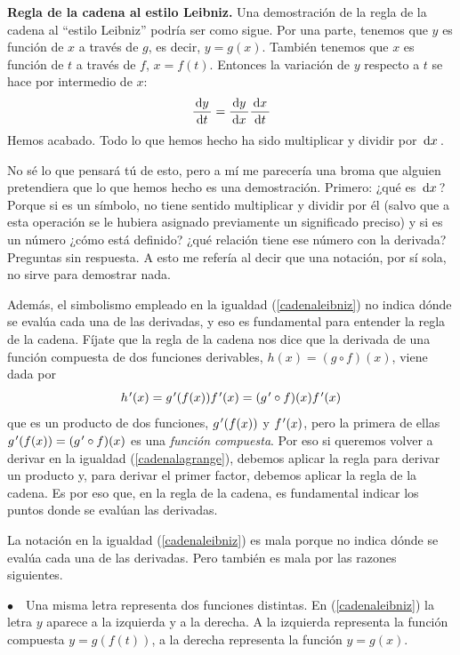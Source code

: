 \noindent \textbf{Regla de la cadena al estilo Leibniz.} Una demostración
de la regla de la cadena al ``estilo Leibniz'' podría ser como sigue.
Por una parte, tenemos que $y$ es función de $x$ a través de $g$,
es decir, $y=g(x)$. También tenemos que $x$ es función de $t$ a
través de $f$, $x=f(t)$. Entonces la variación de $y$ respecto
a $t$ se hace por intermedio de $x$: 
\begin{equation}
\frac{\,\mathrm{d}y\,}{\,\mathrm{d}t\,}=\frac{\,\mathrm{d}y\,}{\,\mathrm{d}x\,}\frac{\,\mathrm{d}x\,}{\,\mathrm{d}t\,}\label{cadenaleibniz}
\end{equation}
Hemos acabado. Todo lo que hemos hecho ha sido multiplicar y dividir
por $\,\mathrm{d}x\,$.

No sé lo que pensará tú de esto, pero a mí me parecería una broma
que alguien pretendiera que lo que hemos hecho es una demostración.
Primero: ¿qué es $\,\mathrm{d}x\,$? Porque si es un símbolo, no tiene sentido
multiplicar y dividir por él (salvo que a esta operación se le hubiera
asignado previamente un significado preciso) y si es un número ¿cómo
está definido? ¿qué relación tiene ese número con la derivada? Preguntas
sin respuesta. A esto me refería al decir que una notación, por sí
sola, no sirve para demostrar nada.

Además, el simbolismo empleado en la igualdad (\ref{cadenaleibniz})
no indica dónde se evalúa cada una de las derivadas, y eso es fundamental
para entender la regla de la cadena. Fíjate que la regla de la cadena
nos dice que la derivada de una función compuesta de dos funciones
derivables, $h(x)=(g\circ f)(x)$, viene dada por 
\begin{equation}
h\mbox{$^{\mspace{2mu}\prime}$}(x)=g\mbox{$^{\mspace{2mu}\prime}$}(f(x))f\mbox{$^{\mspace{2mu}\prime}$}(x)=(g\mbox{$^{\mspace{2mu}\prime}$}\circ f)(x)f\mbox{$^{\mspace{2mu}\prime}$}(x)\label{cadenalagrange}
\end{equation}
que es un producto de dos funciones, $g\mbox{$^{\mspace{2mu}\prime}$}(f(x))$ y $f\mbox{$^{\mspace{2mu}\prime}$}(x)$, pero
la primera de ellas $g\mbox{$^{\mspace{2mu}\prime}$}(f(x))=(g\mbox{$^{\mspace{2mu}\prime}$}\circ f)(x)$ es una \emph{función
compuesta}. Por eso si queremos volver a derivar en la igualdad (\ref{cadenalagrange}),
debemos aplicar la regla para derivar un producto y, para derivar
el primer factor, debemos aplicar la regla de la cadena. Es por eso
que, en la regla de la cadena, es fundamental indicar los puntos donde
se evalúan las derivadas.

La notación en la igualdad (\ref{cadenaleibniz}) es mala porque no
indica dónde se evalúa cada una de las derivadas. Pero también es
mala por las razones siguientes.

$\bullet\quad$Una misma letra representa dos funciones distintas.
En (\ref{cadenaleibniz}) la letra $y$ aparece a la izquierda y a
la derecha. A la izquierda representa la función compuesta $y=g(f(t))$,
a la derecha representa la función $y=g(x)$.

